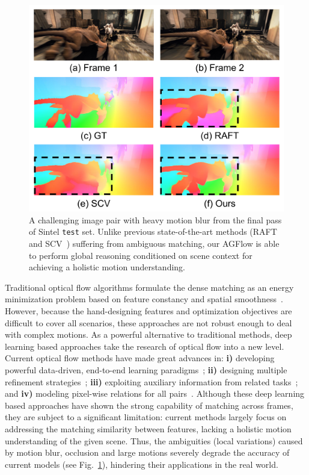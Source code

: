 \documentclass[letterpaper]{article} %
\begin{document}
\begin{figure}[t]
\begin{center}
\includegraphics[width=0.98\linewidth]{figs/fig1_crop}
\end{center}
\caption{A challenging image pair with heavy motion blur from the final pass of Sintel {\tt test} set. Unlike previous state-of-the-art methods (RAFT~\cite{Teed2020RAFTRA} and SCV~\cite{Jiang2021LearningOF}) suffering from ambiguous matching, our AGFlow is able to perform global reasoning conditioned on scene context for achieving a holistic motion understanding.}
\label{fig:teaser}
\end{figure}

Traditional optical flow algorithms formulate the dense matching as an energy minimization problem based on feature constancy and spatial smoothness~\cite{Horn1981DeterminingOF, Brox2004HighAO, Bruhn2005LucasKanadeMH}. However, because the hand-designing features and optimization objectives are difficult to cover all scenarios, these approaches are not robust enough to deal with complex motions. As a powerful alternative to traditional methods, deep learning based approaches take the research of optical flow into a new level. Current optical flow methods have made great advances in: {\bfseries i)} developing powerful data-driven, end-to-end learning paradigms~\cite{Dosovitskiy2015FlowNetLO,Ilg2017FlowNet2E};  {\bfseries ii)} designing multiple refinement strategies~\cite{Sun2018PWCNetCF,Hur2019IterativeRR,Zhao2020MaskFlownetAF}; {\bfseries iii)} exploiting auxiliary information from related tasks~\cite{zhao2020msrn}; and {\bfseries iv)} modeling pixel-wise relations for all pairs~\cite{Teed2020RAFTRA, Jiang2021LearningOF}. Although these deep learning based approaches have shown the strong capability of matching across frames, they are subject to a significant limitation: current methods largely focus on addressing the matching similarity between features, lacking a holistic motion understanding of the given scene. Thus, the ambiguities (local variations) caused by motion blur, occlusion and large motions severely degrade the accuracy of current models (see Fig.~\ref{fig:teaser}), hindering their applications in the real world.
\end{document}
